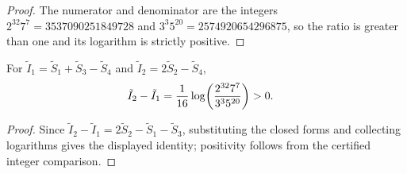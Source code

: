 \begin{proof}
    \leanok
    The numerator and denominator are the integers
    $2^{32}7^7=3537090251849728$ and $3^3 5^{20}=2574920654296875$, so the
    ratio is greater than one and its logarithm is strictly positive.
\end{proof}

\begin{lemma}
    \label{thm:cpsv_example410_mutual_information_defect}
    \leanok
    For $\tilde I_1=\tilde S_1+\tilde S_3-\tilde S_4$ and
    $\tilde I_2=2\tilde S_2-\tilde S_4$,
    \begin{align}
        \tilde I_2-\tilde I_1
         & =\frac1{16}\log\!\left(
        \frac{2^{32}7^7}{3^3 5^{20}}\right)>0.
        \notag
    \end{align}
\end{lemma}

\begin{proof}
    \leanok
    Since $\tilde I_2-\tilde I_1=2\tilde S_2-\tilde S_1-\tilde S_3$,
    substituting the closed forms and collecting logarithms gives the
    displayed identity; positivity follows from the certified integer
    comparison.
\end{proof}

